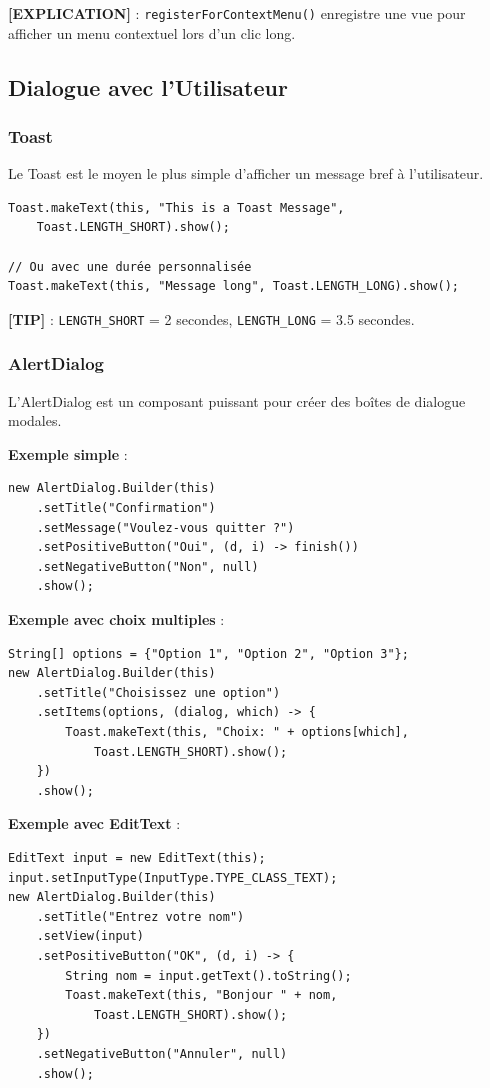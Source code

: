 \documentclass[11pt,a4paper]{article}
\begin{document}
\textbf{[EXPLICATION]} : \texttt{registerForContextMenu()} enregistre une vue pour afficher un menu contextuel lors d'un clic long.

\subsection{Dialogue avec l'Utilisateur}

\subsubsection{Toast}

Le Toast est le moyen le plus simple d'afficher un message bref à l'utilisateur.

\begin{lstlisting}
Toast.makeText(this, "This is a Toast Message", 
    Toast.LENGTH_SHORT).show();

// Ou avec une durée personnalisée
Toast.makeText(this, "Message long", Toast.LENGTH_LONG).show();
\end{lstlisting}

\textbf{[TIP]} : \texttt{LENGTH\_SHORT} = 2 secondes, \texttt{LENGTH\_LONG} = 3.5 secondes.

\subsubsection{AlertDialog}

L'AlertDialog est un composant puissant pour créer des boîtes de dialogue modales.

\textbf{Exemple simple} :
\begin{lstlisting}
new AlertDialog.Builder(this)
    .setTitle("Confirmation")
    .setMessage("Voulez-vous quitter ?")
    .setPositiveButton("Oui", (d, i) -> finish())
    .setNegativeButton("Non", null)
    .show();
\end{lstlisting}

\textbf{Exemple avec choix multiples} :
\begin{lstlisting}
String[] options = {"Option 1", "Option 2", "Option 3"};
new AlertDialog.Builder(this)
    .setTitle("Choisissez une option")
    .setItems(options, (dialog, which) -> {
        Toast.makeText(this, "Choix: " + options[which], 
            Toast.LENGTH_SHORT).show();
    })
    .show();
\end{lstlisting}

\textbf{Exemple avec EditText} :
\begin{lstlisting}
EditText input = new EditText(this);
input.setInputType(InputType.TYPE_CLASS_TEXT);
new AlertDialog.Builder(this)
    .setTitle("Entrez votre nom")
    .setView(input)
    .setPositiveButton("OK", (d, i) -> {
        String nom = input.getText().toString();
        Toast.makeText(this, "Bonjour " + nom, 
            Toast.LENGTH_SHORT).show();
    })
    .setNegativeButton("Annuler", null)
    .show();
\end{lstlisting}
\end{document}
